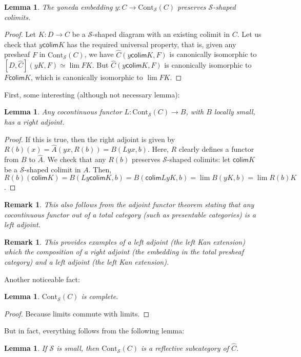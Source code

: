 \documentclass{article}
\newcommand{\Cont}[1]{\text{Cont}_{#1}}
\newcommand{\colim}{\mathsf{colim}}
\newtheorem{remark}[theorem]{Remark}
\newtheorem{lemma}[theorem]{Lemma}
\begin{document}
  \begin{lemma}
    The yoneda embedding $y : C \rightarrow \Cont{\mathcal{S}}(C)$ preserves
    $\mathcal{S}$-shaped colimits.
  \end{lemma}
  \begin{proof}
    Let $K:D\rightarrow C$ be a $\mathcal{S}$-shaped diagram with an existing colimit in
    $C$. Let us check that $y\colim K$ has the required universal property, that
    is, given any presheaf $F$ in $\Cont{\mathcal{S}}(C)$, we have 
    $\hat{C}(y \colim K, F)$ is canonically isomorphic to $[D, \hat{C}](y K,
    F)\simeq \lim FK$.
    But $\hat{C}(y \colim K, F)$ is canonically isomorphic to $F\colim K$, which
    is canonically isomorphic to $\lim FK$.
  \end{proof}
  First, some interesting (although not necessary lemma):
  \begin{lemma}
    Any cocontinuous functor $L:\Cont{\mathcal{S}}(C)\rightarrow B$,
    with $B$ locally small,
    has a right adjoint.
  \end{lemma}
  \begin{proof}
   If this is true, then the right adjoint is given by $R(b)(x) = \hat{A}(y x,
   R(b)) = B(Ly x, b)$. Here, $R$ clearly defines a functor from $B$ to $\hat{A}$.
   We check that any $R(b)$ preserves $\mathcal{S}$-shaped colimits: let $\colim K$ be a 
   $\mathcal{S}$-shaped colimit in $A$. Then, $R(b)(\colim K) = B(Ly\colim K,b)=
   B(\colim LyK, b) = \lim B(yK,b)=\lim R(b)K$.
   \end{proof}
   \begin{remark}
     This also follows from the adjoint functor theorem stating that any
     cocontinuous functor out of a total category (such as presentable
     categories) is a left adjoint.
   \end{remark}
  \begin{remark}
   This provides examples of a left adjoint (the left Kan extension) which the composition of a right
   adjoint (the embedding in the total presheaf category) and a left adjoint
   (the left Kan extension).
  \end{remark}
  Another noticeable fact:
  \begin{lemma}
    $\Cont{\mathcal{S}}(C)$ is complete.
  \end{lemma}
  \begin{proof}
   Because limits commute with limits.
  \end{proof}
  But in fact, everything follows from the following lemma:
  \begin{lemma}
    If $\mathcal{S}$ is small, then
    $\Cont{\mathcal{S}}(C)$ is a reflective subcategory of $\hat{C}$.
  \end{lemma}
\end{document}
